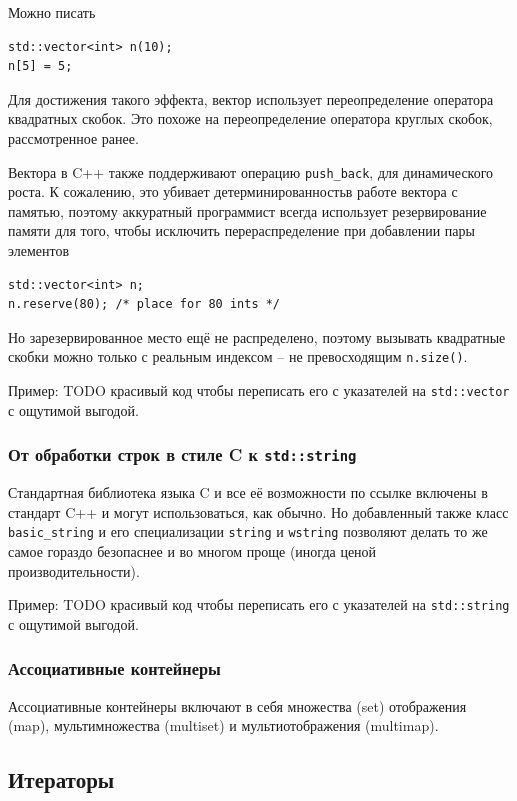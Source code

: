 \documentclass[a4paper,12pt,oneside]{article}
\begin{document}
Можно писать

\begin{lstlisting}
std::vector<int> n(10);
n[5] = 5;
\end{lstlisting}

Для достижения такого эффекта, вектор использует переопределение оператора квадратных скобок. Это похоже на переопределение оператора круглых скобок, рассмотренное ранее.

Вектора в C++ также поддерживают операцию \lstinline!push_back!, для динамического роста. К сожалению, это убивает детерминированностьв  работе вектора с памятью, поэтому аккуратный программист всегда использует резервирование памяти для того, чтобы исключить перераспределение при добавлении пары элементов

\begin{lstlisting}
std::vector<int> n;
n.reserve(80); /* place for 80 ints */
\end{lstlisting}

Но зарезервированное место ещё не распределено, поэтому вызывать квадратные скобки можно только с реальным индексом -- не превосходящим \lstinline!n.size()!.

Пример: TODO красивый код чтобы переписать его с указателей на \lstinline!std::vector! с ощутимой выгодой.

\subsubsection{От обработки строк в стиле C к \lstinline!std::string!}

Стандартная библиотека языка C и все её возможности по ссылке включены в стандарт C++ и могут использоваться, как обычно. Но добавленный также класс \lstinline!basic_string! и его специализации \lstinline!string! и \lstinline!wstring! позволяют делать то же самое гораздо безопаснее и во многом проще (иногда ценой производительности).

Пример: TODO красивый код чтобы переписать его с указателей на \lstinline!std::string! с ощутимой выгодой.

\subsubsection{Ассоциативные контейнеры}

Ассоциативные контейнеры включают в себя множества (set) отображения (map), мультимножества (multiset) и мультиотображения (multimap).

\subsection{Итераторы}
\end{document}
